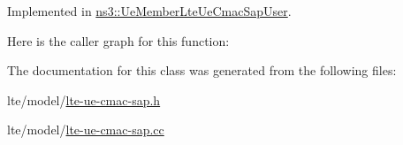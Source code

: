 Implemented in \hyperlink{classns3_1_1UeMemberLteUeCmacSapUser_af26d53d2b50990bcc96ff407dc8e0010}{ns3\+::\+Ue\+Member\+Lte\+Ue\+Cmac\+Sap\+User}.



Here is the caller graph for this function\+:




The documentation for this class was generated from the following files\+:\begin{DoxyCompactItemize}
\item 
lte/model/\hyperlink{lte-ue-cmac-sap_8h}{lte-\/ue-\/cmac-\/sap.\+h}\item 
lte/model/\hyperlink{lte-ue-cmac-sap_8cc}{lte-\/ue-\/cmac-\/sap.\+cc}\end{DoxyCompactItemize}
